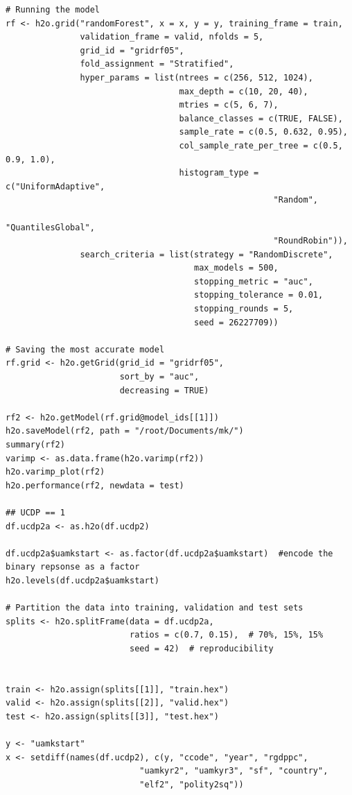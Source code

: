 \begin{verbatim}
# Running the model
rf <- h2o.grid("randomForest", x = x, y = y, training_frame = train, 
               validation_frame = valid, nfolds = 5, 
               grid_id = "gridrf05",
               fold_assignment = "Stratified",
               hyper_params = list(ntrees = c(256, 512, 1024),
                                   max_depth = c(10, 20, 40),
                                   mtries = c(5, 6, 7),
                                   balance_classes = c(TRUE, FALSE),
                                   sample_rate = c(0.5, 0.632, 0.95),
                                   col_sample_rate_per_tree = c(0.5, 0.9, 1.0),
                                   histogram_type = c("UniformAdaptive",
                                                      "Random",
                                                      "QuantilesGlobal",
                                                      "RoundRobin")),
               search_criteria = list(strategy = "RandomDiscrete", 
                                      max_models = 500, 
                                      stopping_metric = "auc", 
                                      stopping_tolerance = 0.01, 
                                      stopping_rounds = 5, 
                                      seed = 26227709)) 

# Saving the most accurate model
rf.grid <- h2o.getGrid(grid_id = "gridrf05",
                       sort_by = "auc",
                       decreasing = TRUE)

rf2 <- h2o.getModel(rf.grid@model_ids[[1]])
h2o.saveModel(rf2, path = "/root/Documents/mk/")
summary(rf2)
varimp <- as.data.frame(h2o.varimp(rf2))
h2o.varimp_plot(rf2)
h2o.performance(rf2, newdata = test)

## UCDP == 1
df.ucdp2a <- as.h2o(df.ucdp2)

df.ucdp2a$uamkstart <- as.factor(df.ucdp2a$uamkstart)  #encode the binary repsonse as a factor
h2o.levels(df.ucdp2a$uamkstart)

# Partition the data into training, validation and test sets
splits <- h2o.splitFrame(data = df.ucdp2a, 
                         ratios = c(0.7, 0.15),  # 70%, 15%, 15%
                         seed = 42)  # reproducibility


train <- h2o.assign(splits[[1]], "train.hex")   
valid <- h2o.assign(splits[[2]], "valid.hex") 
test <- h2o.assign(splits[[3]], "test.hex")

y <- "uamkstart"
x <- setdiff(names(df.ucdp2), c(y, "ccode", "year", "rgdppc",
                           "uamkyr2", "uamkyr3", "sf", "country",
                           "elf2", "polity2sq")) 


\end{verbatim}
